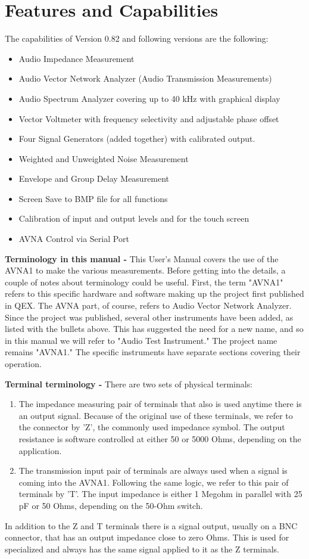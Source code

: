 \part{Features and Capabilities}
The capabilities of Version 0.82 and following versions are the following: 
\begin{itemize}
\item Audio Impedance Measurement
\item Audio Vector Network Analyzer (Audio Transmission Measurements)
\item Audio Spectrum Analyzer covering up to 40 kHz with graphical display
\item Vector Voltmeter with frequency selectivity and adjustable phase offset
\item Four Signal Generators (added together)  with calibrated output.
\item Weighted and Unweighted Noise Measurement
\item Envelope and Group Delay Measurement
\item Screen Save to BMP file for all functions
\item Calibration of input and output levels and for the touch screen
\item AVNA Control via Serial Port
\end{itemize}

\textbf{Terminology in this manual - }This User's Manual covers the use of the AVNA1 to make the various measurements.  Before getting into the details, a couple of notes about terminology could be useful.  First, the term "AVNA1" refers to this specific hardware and software making up the project first published in QEX.  The AVNA part, of course, refers to Audio Vector Network Analyzer.  Since the project was published, several other instruments have been added, as listed with the bullets above.  This has suggested the need for a new name, and so in this manual we will refer to "Audio Test Instrument."  The project name remains "AVNA1."   The specific instruments have separate sections covering their operation.

\textbf{Terminal terminology - }There are two sets of physical terminals:
\begin{enumerate}
\item The impedance measuring pair of terminals that also is used anytime there is an output signal.   Because of the original use of these terminals, we refer to the connector by 'Z', the commonly used impedance symbol.  The output resistance is software controlled at either 50 or 5000 Ohms, depending on the application.
\item The transmission input pair of terminals are always used when a signal is coming into the AVNA1.  Following the same logic, we refer to this pair of terminals by 'T'.  The input impedance is either 1 Megohm in parallel with 25 pF or 50 Ohms, depending on the 50-Ohm switch.
\end{enumerate}
In addition to the Z and T terminals there is a signal output, usually on a BNC connector, that has an output impedance close to zero Ohms.  This is used for specialized and always has the same signal applied to it as the Z terminals.

